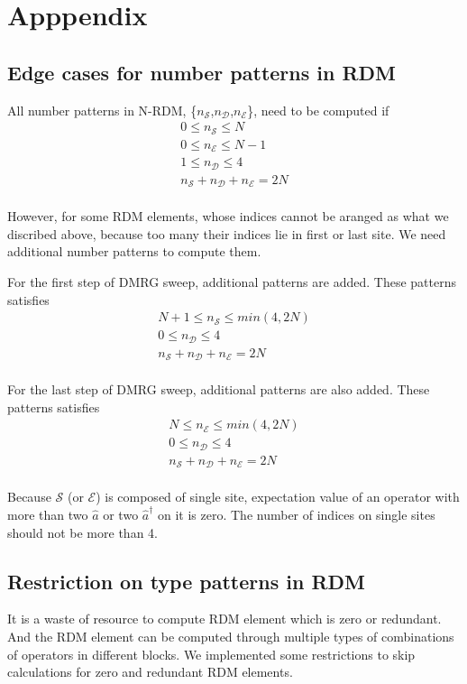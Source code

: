 \section{Apppendix}
\subsection{Edge cases for number patterns in RDM}
All number patterns in N-RDM, \{$n_\mathcal{S}$,$n_\mathcal{D}$,$n_\mathcal{E}$\}, need to be computed if 
\begin{align}
0\le n_\mathcal{S} \le N \\
0\le n_\mathcal{E} \le N-1 \\
1\le n_\mathcal{D} \le 4 \\
n_\mathcal{S} +n_\mathcal{D} +n_\mathcal{E} =2N \\
\end{align}

However, for some RDM elements, whose indices cannot be aranged as what we discribed above, because too many their indices lie in first or last site. We need additional number patterns to compute them.

For the first step of DMRG sweep, additional patterns are added. These patterns satisfies
\begin{align}
N+1\le n_\mathcal{S} \le min(4,2N) \\
0\le n_\mathcal{D} \le 4 \\
n_\mathcal{S} +n_\mathcal{D} +n_\mathcal{E} =2N \\
\end{align}

For the last step of DMRG sweep, additional patterns are also added. These patterns satisfies
\begin{align}
N\le n_\mathcal{E} \le min(4,2N) \\
0\le n_\mathcal{D} \le 4 \\
n_\mathcal{S} +n_\mathcal{D} +n_\mathcal{E} =2N \\
\end{align}

Because $\mathcal{S}$ (or $\mathcal{E}$) is composed of single site, expectation value of an operator with more than two $\hat{a}$ or two $\hat{a}^\dagger$ on it is zero. The number of indices on single sites should not be more than 4.

\subsection{Restriction on type patterns in RDM}
It is a waste of resource to compute RDM element which is zero or redundant. And the RDM element can be computed through multiple types of combinations of operators in different blocks. We implemented some restrictions to skip calculations for zero and redundant RDM elements.

